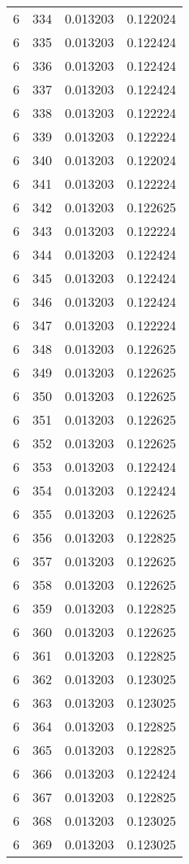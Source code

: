 \begin{longtable}{rrrr}
6 & 334 & 0.013203 & 0.122024 \\
6 & 335 & 0.013203 & 0.122424 \\
6 & 336 & 0.013203 & 0.122424 \\
6 & 337 & 0.013203 & 0.122424 \\
6 & 338 & 0.013203 & 0.122224 \\
6 & 339 & 0.013203 & 0.122224 \\
6 & 340 & 0.013203 & 0.122024 \\
6 & 341 & 0.013203 & 0.122224 \\
6 & 342 & 0.013203 & 0.122625 \\
6 & 343 & 0.013203 & 0.122224 \\
6 & 344 & 0.013203 & 0.122424 \\
6 & 345 & 0.013203 & 0.122424 \\
6 & 346 & 0.013203 & 0.122424 \\
6 & 347 & 0.013203 & 0.122224 \\
6 & 348 & 0.013203 & 0.122625 \\
6 & 349 & 0.013203 & 0.122625 \\
6 & 350 & 0.013203 & 0.122625 \\
6 & 351 & 0.013203 & 0.122625 \\
6 & 352 & 0.013203 & 0.122625 \\
6 & 353 & 0.013203 & 0.122424 \\
6 & 354 & 0.013203 & 0.122424 \\
6 & 355 & 0.013203 & 0.122625 \\
6 & 356 & 0.013203 & 0.122825 \\
6 & 357 & 0.013203 & 0.122625 \\
6 & 358 & 0.013203 & 0.122625 \\
6 & 359 & 0.013203 & 0.122825 \\
6 & 360 & 0.013203 & 0.122625 \\
6 & 361 & 0.013203 & 0.122825 \\
6 & 362 & 0.013203 & 0.123025 \\
6 & 363 & 0.013203 & 0.123025 \\
6 & 364 & 0.013203 & 0.122825 \\
6 & 365 & 0.013203 & 0.122825 \\
6 & 366 & 0.013203 & 0.122424 \\
6 & 367 & 0.013203 & 0.122825 \\
6 & 368 & 0.013203 & 0.123025 \\
6 & 369 & 0.013203 & 0.123025 \\

\end{longtable}
